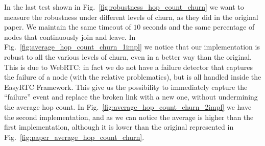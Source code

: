 \newpage
In the last test shown in Fig.~\ref{fig:robustness_hop_count_churn} we want to measure the robustness under different levels of churn, as they did in the original paper. We maintain the same timeout of $10$ seconds and the same percentage of nodes that continuously join and leave. In Fig.~\ref{fig:average_hop_count_churn_1impl} we notice that our implementation is robust to all the various levels of churn, even in a better way than the original. This is due to WebRTC: in fact we do not have a failure detector that captures the failure of a node (with the relative problematics), but is all handled inside the EasyRTC Framework. This give us the possibility to immediately capture the ``failure'' event and replace the broken link with a new one, without undermining the average hop count. In Fig.~\ref{fig:average_hop_count_churn_2impl} we have the second implementation, and as we can notice the average is higher than the first implementation, although it is lower than the original represented in Fig.~\ref{fig:paper_average_hop_count_churn}.

